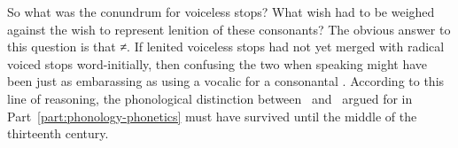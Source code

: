 So what was the conundrum for voiceless stops?
What wish had to be weighed against the wish to represent lenition of these consonants?
The obvious answer to this question is that \lT≠\xD.
If lenited voiceless stops had not yet merged with radical voiced stops word-initially, then confusing the two when speaking might have been just as embarassing as using a vocalic  for a consonantal \mw{\cw}. 
According to this line of reasoning, the phonological distinction between \lT\ and \xD\ argued for in Part~\ref{part:phonology-phonetics} must have survived until the middle of the thirteenth century.

